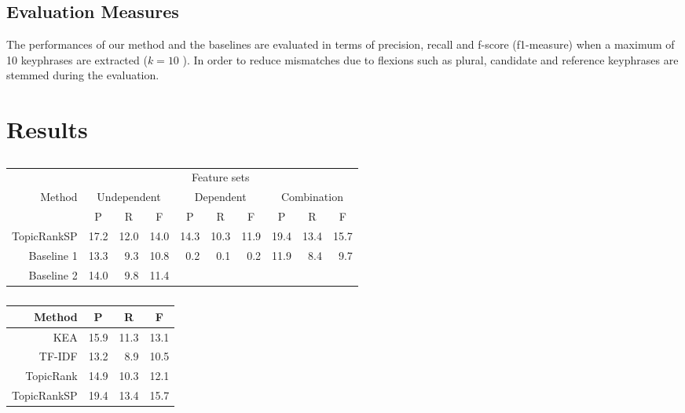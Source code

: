   \subsection{Evaluation Measures}
  \label{subsec:evaluation_measures}
    The performances of our method and the baselines are evaluated in terms of
    precision, recall and f-score (f1-measure) when a maximum of 10 keyphrases
    are extracted ($k = 10$ ). In order to reduce
    mismatches due to flexions such as plural, candidate and reference
    keyphrases are stemmed during the evaluation.

\section{Results}
\label{sec:results}
  \begin{table*}
    \centering
    \begin{tabular}{rrrrrrrrrr}
      \toprule
      & \multicolumn{9}{c}{Feature sets}\\
      \cmidrule{2-10}
      Method & \multicolumn{3}{c}{Undependent} & \multicolumn{3}{c}{Dependent} & \multicolumn{3}{c}{Combination}\\
      \cmidrule(r){2-4}
      \cmidrule{5-7}
      \cmidrule(l){8-10}
      & \multicolumn{1}{c}{P} & \multicolumn{1}{c}{R} & \multicolumn{1}{c}{F} & \multicolumn{1}{c}{P} & \multicolumn{1}{c}{R} & \multicolumn{1}{c}{F} & \multicolumn{1}{c}{P} & \multicolumn{1}{c}{R} & \multicolumn{1}{c}{F}\\
      \midrule
      TopicRankSP & 17.2 & 12.0 & 14.0
                  & 14.3 & 10.3 & 11.9
                  & 19.4 & 13.4 & 15.7\\
      Baseline 1  & 13.3 & 9.3 & 10.8
                  & 0.2 & 0.1 & 0.2
                  & 11.9 & 8.4 & 9.7\\
      Baseline 2  & 14.0 & 9.8 & 11.4
                  &  &  & 
                  &  &  & \\
      \bottomrule
    \end{tabular}
    \caption{
             \label{tab:baseline_comparison}}
  \end{table*}

  \begin{table}[h]
    \centering
    \begin{tabular}{rrrr}
      \toprule
      Method & \multicolumn{1}{c}{P} & \multicolumn{1}{c}{R} & \multicolumn{1}{c}{F}\\
      \midrule
      KEA         & 15.9 & 11.3 & 13.1\\
      TF-IDF      & 13.2 & 8.9 & 10.5\\
      TopicRank   & 14.9 & 10.3 & 12.1\\
      TopicRankSP & 19.4 & 13.4 & 15.7\\
      \bottomrule
    \end{tabular}
    \caption{
             \label{tab:state_of_the_art_comparison}}
  \end{table}


